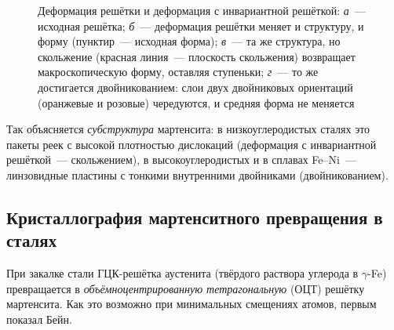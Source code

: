 \begin{figure}[ht]
\caption{Деформация решётки и деформация с инвариантной решёткой:
\textit{а}~— исходная решётка; \textit{б}~— деформация решётки меняет и
структуру, и форму (пунктир~— исходная форма); \textit{в}~— та же
структура, но скольжение (красная линия~— плоскость скольжения)
возвращает макроскопическую форму, оставляя ступеньки; \textit{г}~— то же
достигается двойникованием: слои двух двойниковых ориентаций (оранжевые и
розовые) чередуются, и средняя форма не меняется}
\label{fig:lis}
\end{figure}

Так объясняется \emph{субструктура} мартенсита: в низкоуглеродистых сталях
это пакеты реек с высокой плотностью дислокаций (деформация с
инвариантной решёткой~— скольжением), в высокоуглеродистых и в сплавах
Fe--Ni~— линзовидные пластины с тонкими внутренними двойниками
(двойникованием).

\subsection{Кристаллография мартенситного превращения в сталях}\label{ssec:martensite-cryst}

При закалке стали ГЦК-решётка аустенита (твёрдого раствора углерода в
$\gamma$-Fe) превращается в \emph{объёмноцентрированную тетрагональную}
(ОЦТ) решётку мартенсита. Как это возможно при минимальных смещениях
атомов, первым показал Бейн.

